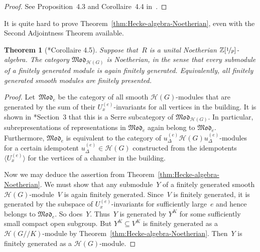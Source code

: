 \documentclass{amsart}
\newtheorem{theorem}{Theorem}[section]
\theoremstyle{remark}
\theoremstyle{definition}
\newcommand*{\idem}[1]{\langle#1\rangle}%
\newcommand*{\Z}{\mathbb Z}%
\newcommand*{\Mod}[1]{\mathfrak{Mod}_{#1}}%
\newcommand*{\UC}[1]{U_{#1}}%
\newcommand{\ring}{R}%
\newcommand*{\Hecke}{\mathcal H}%
\begin{document}
\begin{proof}
  See Proposition~4.3 and Corollaire~4.4 in~\cite{Dat:Finitude}.
\end{proof}

It is quite hard to prove Theorem~\ref{thm:Hecke-algebra-Noetherian}, even with the Second Adjointness Theorem available.

\begin{theorem}[\cite{Dat:Finitude}*{Corollaire 4.5}]
  \label{thm:modG-Noetherian}
  Suppose that~\(\ring\) is a unital Noetherian \(\Z[\nicefrac1p]\)-algebra.  The category \(\Mod{\Hecke(G)}\) is Noetherian, in the sense that every submodule of a finitely generated module is again finitely generated.  Equivalently, all finitely generated smooth modules are finitely presented.
\end{theorem}

\begin{proof}
  Let~\(\Mod{e}\) be the category of all smooth \(\Hecke(G)\)-modules that are generated by the sum of their \(\UC{x}^{(e)}\)-invariants for all vertices in the building.  It is shown in \cite{Meyer-Solleveld:Resolutions}*{Section~3} that this is a Serre subcategory of \(\Mod{\Hecke(G)}\).  In particular, subrepresentations of representations in \(\Mod{e}\) again belong to \(\Mod{e}\).  Furthermore, \(\Mod{e}\) is equivalent to the category of \(u_\Delta^{(e)} \Hecke(G) u_\Delta^{(e)}\)-modules for a certain idempotent \(u_\Delta^{(e)}\in \Hecke(G)\) constructed from the idempotents \(\idem{\UC{x}^{(e)}}\) for the vertices of a chamber in the building.

  Now we may deduce the assertion from Theorem~\ref{thm:Hecke-algebra-Noetherian}.  We must show that any submodule~\(Y\) of a finitely generated smooth \(\Hecke(G)\)-module~\(V\) is again finitely generated.  Since~\(V\) is finitely generated, it is generated by the subspace of \(\UC{x}^{(e)}\)-invariants for sufficiently large~\(e\) and hence belongs to \(\Mod{e}\).  So does~\(Y\).  Thus~\(Y\) is generated by \(Y^K\) for some sufficiently small compact open subgroup.  But \(Y^K\subseteq V^K\) is finitely generated as a \(\Hecke(G/\!\!/K)\)-module by Theorem~\ref{thm:Hecke-algebra-Noetherian}.  Then~\(Y\) is finitely generated as a \(\Hecke(G)\)-module.
\end{proof}
\end{document}
